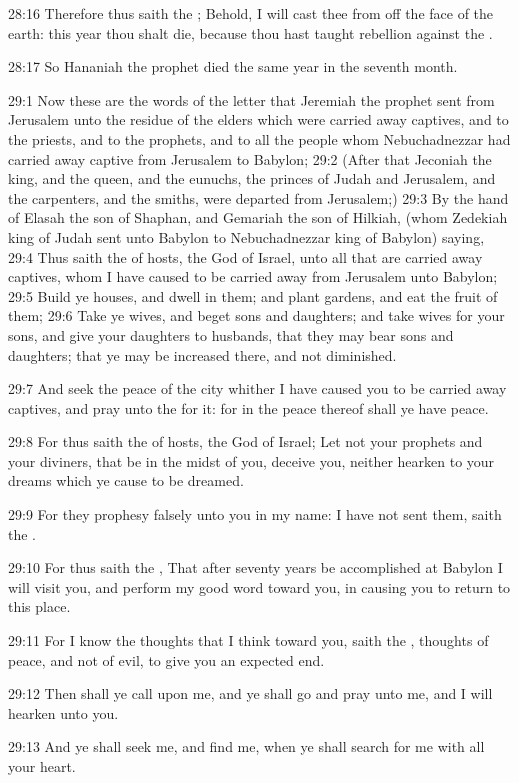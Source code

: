 28:16 Therefore thus saith the \LORD; Behold, I will cast thee from off
the face of the earth: this year thou shalt die, because thou hast
taught rebellion against the \LORD.

28:17 So Hananiah the prophet died the same year in the seventh month.

29:1 Now these are the words of the letter that Jeremiah the prophet
sent from Jerusalem unto the residue of the elders which were carried
away captives, and to the priests, and to the prophets, and to all the
people whom Nebuchadnezzar had carried away captive from Jerusalem to
Babylon; 29:2 (After that Jeconiah the king, and the queen, and the
eunuchs, the princes of Judah and Jerusalem, and the carpenters, and
the smiths, were departed from Jerusalem;) 29:3 By the hand of Elasah
the son of Shaphan, and Gemariah the son of Hilkiah, (whom Zedekiah
king of Judah sent unto Babylon to Nebuchadnezzar king of Babylon)
saying, 29:4 Thus saith the \LORD of hosts, the God of Israel, unto all
that are carried away captives, whom I have caused to be carried away
from Jerusalem unto Babylon; 29:5 Build ye houses, and dwell in them;
and plant gardens, and eat the fruit of them; 29:6 Take ye wives, and
beget sons and daughters; and take wives for your sons, and give your
daughters to husbands, that they may bear sons and daughters; that ye
may be increased there, and not diminished.

29:7 And seek the peace of the city whither I have caused you to be
carried away captives, and pray unto the \LORD for it: for in the peace
thereof shall ye have peace.

29:8 For thus saith the \LORD of hosts, the God of Israel; Let not your
prophets and your diviners, that be in the midst of you, deceive you,
neither hearken to your dreams which ye cause to be dreamed.

29:9 For they prophesy falsely unto you in my name: I have not sent
them, saith the \LORD.

29:10 For thus saith the \LORD, That after seventy years be
accomplished at Babylon I will visit you, and perform my good word
toward you, in causing you to return to this place.

29:11 For I know the thoughts that I think toward you, saith the \LORD,
thoughts of peace, and not of evil, to give you an expected end.

29:12 Then shall ye call upon me, and ye shall go and pray unto me,
and I will hearken unto you.

29:13 And ye shall seek me, and find me, when ye shall search for me
with all your heart.

